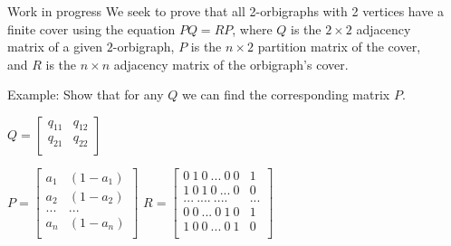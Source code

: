 \documentclass[final]{beamer}
\newlength{\sepwid}
\newlength{\onecolwid}
\begin{document}
\begin{frame}[t]
\begin{columns}[t]
\begin{column}{\sepwid}\end{column} %

\begin{column}{\onecolwid} %


\begin{block}{Work in progress}
We seek to prove that all 2-orbigraphs with 2 vertices have a finite cover using the equation $PQ=RP$, where $Q$ is the $2\times2$ adjacency matrix of a given $2$-orbigraph, $P$ is the $n\times 2$ partition matrix of the cover, and $R$ is the $n\times n$ adjacency matrix of the orbigraph's cover. 

\bigskip
Example: Show that for any $Q$ we can find the corresponding matrix $P$.
\begin{center}
$Q= 
  \left[ {\begin{array}{cc}
  q_{11} & q_{12}\\
  q_{21} & q_{22}\\ 

  \end{array} } \right]
  $
  \end{center}
  $P= 
  \left[ {\begin{array}{cc}
  a_1 & (1-a_1)\\
  a_2 & (1-a_2)\\ 
  ... & ...\\
  a_n & (1-a_n)\\

  \end{array} } \right]
  $
    $R= 
  \left[ {\begin{array}{cccc}
  0\ 1\ 0\ ...\ 0\ 0 & 1\\
 1\ 0\ 1\ 0\ ...\ 0 & 0\\ 
  ...\ ....\ .... & ...\\
 0\ 0\  ...\ 0\ 1\ 0 & 1\\
 1\ 0\  0\ ...\ 0\ 1 & 0\\

  \end{array} } \right]
  $
  
\end{block}


\end{column}
\end{columns}
\end{frame}
\end{document}
